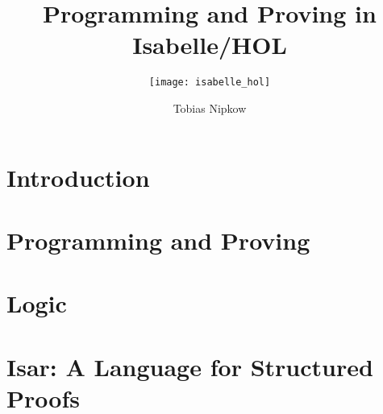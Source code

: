 \documentclass[envcountsame,envcountchap]{svmono}
\begin{document}
\title{Programming and Proving in Isabelle/HOL}
\subtitle{\texttt{[image: isabelle\_hol]}}
\author{Tobias Nipkow}
\maketitle

\frontmatter%

\setcounter{tocdepth}{1}
\tableofcontents


\mainmatter%


\chapter{Introduction}


\chapter{Programming and Proving}
\label{sec:FP}




%

\chapter{Logic}
\label{ch:Logic}


\chapter{Isar: A Language for Structured Proofs}
\label{ch:Isar}


\backmatter%




\end{document}

